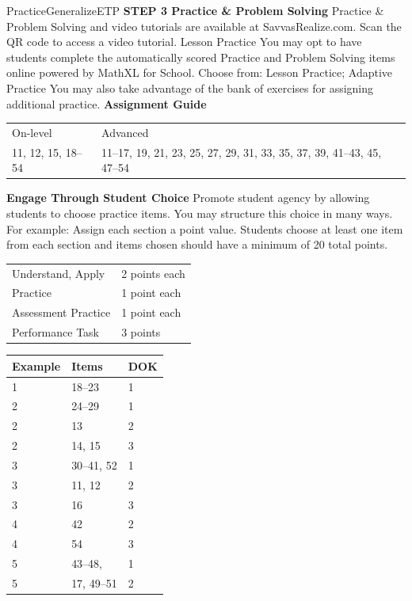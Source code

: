 \documentclass{article}
\newenvironment{item-analysis}{}{}      %
\newenvironment{te-addendum}[2]{}{}     %
\newcommand{\te}[1]{}                   %
\begin{document}
\begin{te-addendum}{Practice}{GeneralizeETP}
\textbf{STEP 3 Practice \& Problem Solving}
Practice \& Problem Solving and video tutorials are available at SavvasRealize.com.
Scan the QR code to access a video tutorial.
Lesson Practice You may opt to have students complete the automatically scored Practice and Problem Solving items online powered by MathXL for School.
Choose from: Lesson Practice; Adaptive Practice
You may also take advantage of the bank of exercises for assigning additional practice.
\textbf{Assignment Guide}
\begin{tabular}{ll}
On-level & Advanced \\
11, 12, 15, 18--54 & 11--17, 19, 21, 23, 25, 27, 29, 31, 33, 35, 37, 39, 41--43, 45, 47--54 \\
\end{tabular}
\textbf{Engage Through Student Choice}
Promote student agency by allowing students to choose practice items. You may structure this choice in many ways.
For example:
Assign each section a point value. Students choose at least one item from each section and items chosen should have a minimum of 20 total points.
\begin{tabular}{ll}
Understand, Apply & 2 points each \\
Practice & 1 point each \\
Assessment Practice & 1 point each \\
Performance Task & 3 points \\
\end{tabular}
\end{te-addendum}
\begin{item-analysis}
\begin{tabular}{lll}
\toprule
Example & Items & DOK \\
\midrule
1 & 18--23 & 1 \\
2 & 24--29 & 1 \\
2 & 13 & 2 \\
2 & 14, 15 & 3 \\
3 & 30--41, 52 & 1 \\
3 & 11, 12 & 2 \\
3 & 16 & 3 \\
4 & 42 & 2 \\
4 & 54 & 3 \\
5 & 43--48, \te{52} & 1 \\
5 & 17, 49--51 & 2 \\
\bottomrule
\end{tabular}
\te{The printed table lists item 52 under both Examples 3 and 5, each DOK 1. The second occurrence is retained as a teacher annotation to avoid a duplicate parser assignment. Item 53 is absent from the printed table.}
\end{item-analysis}
\end{document}
